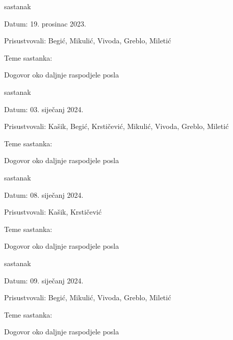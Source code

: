\begin{packed_enum}
            \item  sastanak
			\item[] \begin{packed_item}
				\item Datum: 19. prosinac 2023.
				\item Prisustvovali: Begić, Mikulić, Vivoda, Greblo, Miletić
				\item Teme sastanka:
				\begin{packed_item}
					\item  Dogovor oko daljnje raspodjele posla
				\end{packed_item}
			\end{packed_item}

            \item  sastanak
			\item[] \begin{packed_item}
				\item Datum: 03. siječanj 2024.
				\item Prisustvovali: Kašik, Begić, Krstičević, Mikulić, Vivoda, Greblo, Miletić
				\item Teme sastanka:
				\begin{packed_item}
					\item  Dogovor oko daljnje raspodjele posla
				\end{packed_item}
			\end{packed_item}

            \item  sastanak
			\item[] \begin{packed_item}
				\item Datum: 08. siječanj 2024.
				\item Prisustvovali: Kašik, Krstičević
				\item Teme sastanka:
				\begin{packed_item}
					\item  Dogovor oko daljnje raspodjele posla
				\end{packed_item}
			\end{packed_item}

            \item  sastanak
			\item[] \begin{packed_item}
				\item Datum: 09. siječanj 2024.
				\item Prisustvovali: Begić, Mikulić, Vivoda, Greblo, Miletić
				\item Teme sastanka:
				\begin{packed_item}
					\item  Dogovor oko daljnje raspodjele posla
				\end{packed_item}
			\end{packed_item}


\end{packed_enum}
